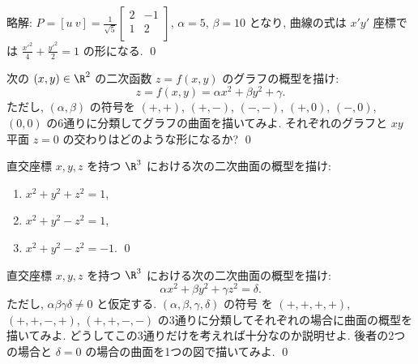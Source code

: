 \documentclass[12pt,twoside]{jarticle}
\newcommand\commentout[1]{#1}
\newcommand\commentout[1]{}
\begin{document}
\commentout{
\medskip
\noindent
略解: $\displaystyle
P = [u\ v] =
\frac{1}{\sqrt{5}}
\begin{bmatrix}
  2 & -1 \\
  1 &  2 \\
\end{bmatrix}$, $\alpha=5$, $\beta=10$ となり, 
曲線の式は $x'y'$ 座標では $\displaystyle
\frac{{x'}^2}{4} + \frac{{y'}^2}{2} = 1$ の形になる. \qed
}


\begin{question}
  次の $(x,y)\in\R^2$ の二次函数 $z=f(x,y)$ のグラフの概型を描け:
  \begin{equation*}
    z = f(x,y) = \alpha x^2 + \beta y^2 + \gamma.
  \end{equation*}
  ただし, $(\alpha,\beta)$ の符号を $(+,+)$, $(+,-)$, $(-,-)$, $(+,0)$,
  $(-,0)$, $(0,0)$ の6通りに分類してグラフの曲面を描いてみよ.
  それぞれのグラフと $xy$ 平面 $z=0$ の交わりはどのような形になるか?
  \qed
\end{question}


\begin{question}
  直交座標 $x,y,z$ を持つ $\R^3$ における次の二次曲面の概型を描け:
  \begin{enumerate}
  \item $x^2 + y^2 + z^2 = 1$,
  \item $x^2 + y^2 - z^2 = 1$,
  \item $x^2 + y^2 - z^2 = -1$.
    \qed
  \end{enumerate}
\end{question}


\begin{question}
\label{q:quadric-sufaces}
  直交座標 $x,y,z$ を持つ $\R^3$ における次の二次曲面の概型を描け:
  \begin{equation*}
    \alpha x^2 + \beta y^2 + \gamma z^2 = \delta.
  \end{equation*}
  ただし, $\alpha\beta\gamma\delta\ne 0$ と仮定する.
  $(\alpha,\beta,\gamma,\delta)$ の符号
  を $(+,+,+,+)$, $(+,+,-,+)$, $(+,+,-,-)$
  の3通りに分類してそれぞれの場合に曲面の概型を描いてみよ.
  どうしてこの3通りだけを考えれば十分なのか説明せよ.
  後者の2つの場合と $\delta=0$ の場合の曲面を1つの図で描いてみよ.
  \qed
\end{question}
\end{document}
